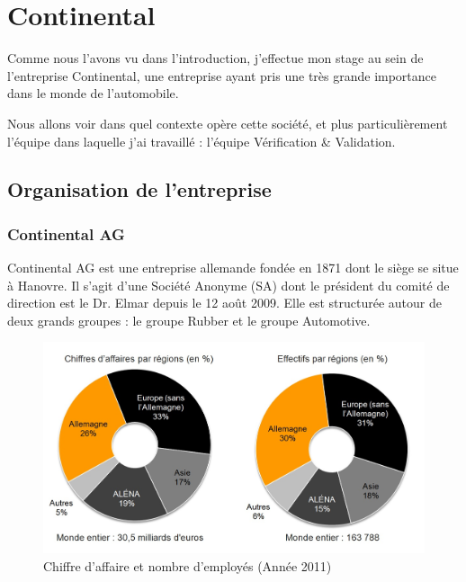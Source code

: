 \chapter{Continental}\label{chapConti}
\begin{figure}
\vspace{-25px}
\begin{minipage}{0.60\textwidth}
\minitoc
\end{minipage}
\end{figure}
Comme nous l'avons vu dans l'introduction, j'effectue mon stage au sein de l'entreprise Continental, une entreprise ayant pris une très grande importance dans le monde de l'automobile. 

Nous allons voir dans quel contexte opère cette société, et plus particulièrement l'équipe dans laquelle j'ai travaillé : l'équipe Vérification \& Validation.
	\section{Organisation de l'entreprise}
		\subsection{Continental AG}

Continental AG est une entreprise allemande fondée en 1871 dont le siège se situe à Hanovre. Il s'agit d'une Société Anonyme (SA) dont le président du comité de
direction est le Dr. Elmar  depuis le 12 août 2009. Elle est structurée autour de deux grands groupes : le groupe Rubber et le groupe Automotive.
	 
		 \begin{figure}[H]
		 	\centering
		 	\includegraphics[width=12cm]{contents/images/caConti.jpg}
		 	\caption{Chiffre d'affaire et nombre d'employés (Année 2011)}
		 	\label{fig:caConti}
		 \end{figure}

